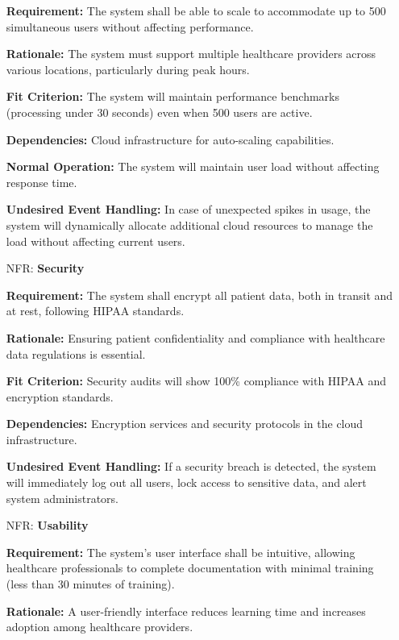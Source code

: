 \documentclass[12pt]{article}
\newcounter{nfrnum} %
\begin{document}
\begin{itemize}
    \textbf{Requirement:} The system shall be able to scale to accommodate up to 500 simultaneous users without affecting performance.  
  
    \textbf{Rationale:} The system must support multiple healthcare providers across various locations, particularly during peak hours.  
  
    \textbf{Fit Criterion:} The system will maintain performance benchmarks (processing under 30 seconds) even when 500 users are active.  
  
    \textbf{Dependencies:} Cloud infrastructure for auto-scaling capabilities.  
  
    \textbf{Normal Operation:} The system will maintain user load without affecting response time.  
  
    \textbf{Undesired Event Handling:} In case of unexpected spikes in usage, the system will dynamically allocate additional cloud resources to manage the load without affecting current users.

\item[NFR\refstepcounter{nfrnum}\thenfrnum \label{NFR_Security}:] \textbf{Security}  

    \textbf{Requirement:} The system shall encrypt all patient data, both in transit and at rest, following HIPAA standards.  
  
    \textbf{Rationale:} Ensuring patient confidentiality and compliance with healthcare data regulations is essential.  
  
    \textbf{Fit Criterion:} Security audits will show 100\% compliance with HIPAA and encryption standards.  
  
    \textbf{Dependencies:} Encryption services and security protocols in the cloud infrastructure.  
  
    \textbf{Undesired Event Handling:} If a security breach is detected, the system will immediately log out all users, lock access to sensitive data, and alert system administrators.

\item[NFR\refstepcounter{nfrnum}\thenfrnum \label{NFR_Usability}:] \textbf{Usability}  

    \textbf{Requirement:} The system’s user interface shall be intuitive, allowing healthcare professionals to complete documentation with minimal training (less than 30 minutes of training).  
  
    \textbf{Rationale:} A user-friendly interface reduces learning time and increases adoption among healthcare providers.  
  

\end{itemize}
\end{document}
